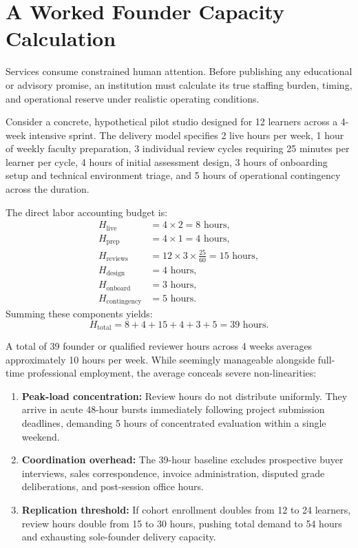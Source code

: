 
\section{A Worked Founder Capacity Calculation}

Services consume constrained human attention. Before publishing any educational or advisory promise, an institution must calculate its true staffing burden, timing, and operational reserve under realistic operating conditions.

Consider a concrete, hypothetical pilot studio designed for 12 learners across a 4-week intensive sprint. The delivery model specifies 2 live hours per week, 1 hour of weekly faculty preparation, 3 individual review cycles requiring 25 minutes per learner per cycle, 4 hours of initial assessment design, 3 hours of onboarding setup and technical environment triage, and 5 hours of operational contingency across the duration.

The direct labor accounting budget is:
\begin{equation}
\begin{aligned}
H_{\text{live}} &= 4 \times 2 = 8\text{ hours}, \\
H_{\text{prep}} &= 4 \times 1 = 4\text{ hours}, \\
H_{\text{reviews}} &= 12 \times 3 \times \frac{25}{60} = 15\text{ hours}, \\
H_{\text{design}} &= 4\text{ hours}, \\
H_{\text{onboard}} &= 3\text{ hours}, \\
H_{\text{contingency}} &= 5\text{ hours}.
\end{aligned}
\end{equation}
Summing these components yields:
\begin{equation}
H_{\text{total}} = 8 + 4 + 15 + 4 + 3 + 5 = 39\text{ hours}.
\end{equation}

A total of 39 founder or qualified reviewer hours across 4 weeks averages approximately 10 hours per week. While seemingly manageable alongside full-time professional employment, the average conceals severe non-linearities:
\begin{enumerate}[leftmargin=*]
\item \textbf{Peak-load concentration:} Review hours do not distribute uniformly. They arrive in acute 48-hour bursts immediately following project submission deadlines, demanding 5 hours of concentrated evaluation within a single weekend.
\item \textbf{Coordination overhead:} The 39-hour baseline excludes prospective buyer interviews, sales correspondence, invoice administration, disputed grade deliberations, and post-session office hours.
\item \textbf{Replication threshold:} If cohort enrollment doubles from 12 to 24 learners, review hours double from 15 to 30 hours, pushing total demand to 54 hours and exhausting sole-founder delivery capacity.
\end{enumerate}

